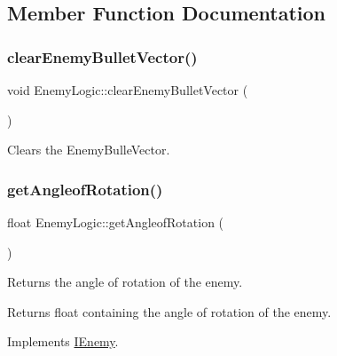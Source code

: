 \subsection{Member Function Documentation}
\mbox{\label{class_enemy_logic_af85aebe59b9cdee37bdab690fa496348}} 
\subsubsection{\texorpdfstring{clear\+Enemy\+Bullet\+Vector()}{clearEnemyBulletVector()}}
{\footnotesize\ttfamily void Enemy\+Logic\+::clear\+Enemy\+Bullet\+Vector (\begin{DoxyParamCaption}{ }\end{DoxyParamCaption})}



Clears the Enemy\+Bulle\+Vector. 

\mbox{\label{class_enemy_logic_ade03be41505c71de49f20fc855c8fede}} 
\subsubsection{\texorpdfstring{get\+Angleof\+Rotation()}{getAngleofRotation()}}
{\footnotesize\ttfamily float Enemy\+Logic\+::get\+Angleof\+Rotation (\begin{DoxyParamCaption}{ }\end{DoxyParamCaption})\hspace{0.3cm}{\ttfamily [virtual]}}



Returns the angle of rotation of the enemy. 

\begin{DoxyReturn}{Returns}
float containing the angle of rotation of the enemy. 
\end{DoxyReturn}


Implements \hyperlink{class_i_enemy_a8a9780d5db69d910f264fd7ab89ebee6}{I\+Enemy}.

